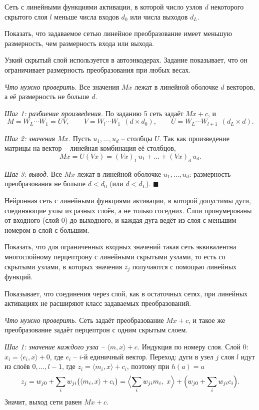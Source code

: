 \documentclass[12pt,a4paper]{article}
\begin{document}
\dano Сеть с линейными функциями активации, в которой число узлов $d$
некоторого скрытого слоя $l$ меньше числа входов $d_0$ или числа выходов $d_L$.

\treb Показать, что задаваемое сетью линейное преобразование имеет меньшую
размерность, чем размерность входа или выхода.

\zachem Узкий скрытый слой используется в автоэнкодерах. Задание показывает, что
он ограничивает размерность преобразования при любых весах.

\resh \emph{Что нужно проверить.} Все значения $Mx$ лежат в линейной оболочке
$d$ векторов, а её размерность не больше $d$.

\emph{Шаг 1: разбиение произведения.} По заданию 5 сеть задаёт $Mx + c$, и
\[
  M = W_L\cdots W_1 = UV,
  \qquad
  V = W_l\cdots W_1 \ \ (d \times d_0),
  \qquad
  U = W_L\cdots W_{l+1} \ \ (d_L \times d) .
\]

\emph{Шаг 2: значения $Mx$.} Пусть $u_1, \dots, u_d$ -- столбцы $U$. Так как
произведение матрицы на вектор -- линейная комбинация её столбцов,
\[
  Mx = U(Vx) = (Vx)_1\,u_1 + \dots + (Vx)_d\,u_d .
\]

\emph{Шаг 3: вывод.} Все $Mx$ лежат в линейной оболочке $u_1, \dots, u_d$:
размерность преобразования не больше $d < d_0$ (или $d < d_L$). $\blacksquare$

\dano Нейронная сеть с линейными функциями активации, в которой допустимы дуги,
соединяющие узлы из разных слоёв, а не только соседних. Слои пронумерованы от
входного (слой 0) до выходного, и каждая дуга ведёт из слоя с меньшим номером в
слой с большим.

\treb Показать, что для ограниченных входных значений такая сеть эквивалентна
многослойному перцептрону с линейными скрытыми узлами, то есть со скрытыми
узлами, в которых значения $z_j$ получаются с помощью линейных функций.

\zachem Показывает, что соединения через слой, как в остаточных сетях, при
линейных активациях не расширяют класс задаваемых преобразований.

\resh \emph{Что нужно проверить.} Сеть задаёт преобразование $Mx + c$, и такое
же преобразование задаёт перцептрон с одним скрытым слоем.

\emph{Шаг 1: значение каждого узла -- $\langle m, x\rangle + c$.} Индукция по
номеру слоя. Слой 0: $x_i = \langle e_i, x\rangle + 0$, где $e_i$ -- $i$-й
единичный вектор. Переход: дуги в узел $j$ слоя $l$ идут из слоёв
$0, \dots, l-1$, где $z_i = \langle m_i, x\rangle + c_i$, поэтому при $h(a) = a$
\[
  z_j = w_{j0} + \sum_i w_{ji}\bigl(\langle m_i, x\rangle + c_i\bigr)
      = \Bigl\langle \sum_i w_{ji}m_i,\ x\Bigr\rangle
        + \Bigl(w_{j0} + \sum_i w_{ji}c_i\Bigr) .
\]
Значит, выход сети равен $Mx + c$.
\end{document}

